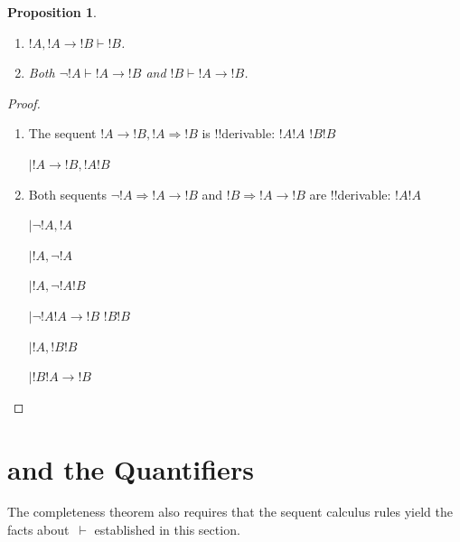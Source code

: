 \documentclass[10pt,a4paper]{article}
\theoremstyle{plain}
\newtheorem{prop}[thm]{Proposition}
\theoremstyle{definition}
\theoremstyle{remark}
\newenvironment{explain}{}{}
\newcommand*{\olfileid}[3]{}
\newcommand*{\olsection}[1]{\section*{#1}}
\newcommand*{\ollabel}[1]{\label{#1}}
\providecommand{\RightLabel}[1]{}
\providecommand{\DisplayProof}{}
\providecommand{\fCenter}{}
\newenvironment{prooftree}{}{}
\providecommand{\lif}{\mathbin{\rightarrow}}
\providecommand{\Sequent}{\mathrel{\Rightarrow}}
\providecommand{\Proves}{\mathrel{\vdash}}
\providecommand{\LeftR}[1]{}
\providecommand{\RightR}[1]{}
\providecommand{\UnaryInf}{\ensuremath{\mid}}
\providecommand{\BinaryInf}{\ensuremath{\mid}}
\providecommand{\Weakening}{\mathrm{Wk}}
\providecommand{\RightR}{\mathrm{R}}
\providecommand{\LeftR}{\mathrm{L}}
\providecommand{\Axiom}{\mathrm{Ax}}
\providecommand{\bottomAlignProof}{\relax}
\providecommand{\bottomAlignProof}{\relax}
\begin{document}
\begin{prop}\ollabel{prop:provability-lif}
  \begin{enumerate}
  \item \ollabel{prop:provability-lif-left}  $!A, !A \lif !B \Proves !B$.
  \item \ollabel{prop:provability-lif-right}
    Both $\lnot !A \Proves !A \lif !B$ and $!B \Proves !A \lif !B$.
  \end{enumerate}
\end{prop}

\begin{proof}
  \begin{enumerate}
    \item The sequent $!A \lif !B, !A \Sequent !B$ is !!{derivable}:
      \begin{prooftree}
        \Axiom$!A \fCenter !A$
        \Axiom$!B \fCenter !B$
        \RightLabel{\LeftR{\lif}}
        \BinaryInf$!A \lif !B, !A  \fCenter !B$
      \end{prooftree}
    \item Both sequents $\lnot !A \Sequent !A \lif !B$ and $!B
      \Sequent !A \lif !B$ are !!{derivable}:
      \begin{prooftree}
        \Axiom$!A \fCenter !A$
        \RightLabel{\LeftR{\lnot}}
        \UnaryInf$\lnot !A, !A \fCenter$
        \RightLabel{\LeftR{\Exchange}}
        \UnaryInf$!A, \lnot !A \fCenter$
        \RightLabel{\RightR{\Weakening}}
        \UnaryInf$!A, \lnot !A \fCenter !B$
        \RightLabel{\RightR{\lif}}
        \UnaryInf$\lnot !A \fCenter !A \lif !B$
        \DisplayProof\qquad\bottomAlignProof
        \Axiom$!B \fCenter !B$
        \RightLabel{\LeftR{\Weakening}}
        \UnaryInf$!A, !B \fCenter !B$
        \RightLabel{\RightR{\lif}}
        \UnaryInf$!B \fCenter !A \lif !B$
      \end{prooftree}
  \end{enumerate}
\end{proof}





\olfileid{fol}{seq}{qpr}
\olsection{ and the Quantifiers}

\begin{explain}
  The completeness theorem also requires that the sequent calculus
  rules yield the facts about~$\Proves$ established in this
  section.
\end{explain}
\end{document}

